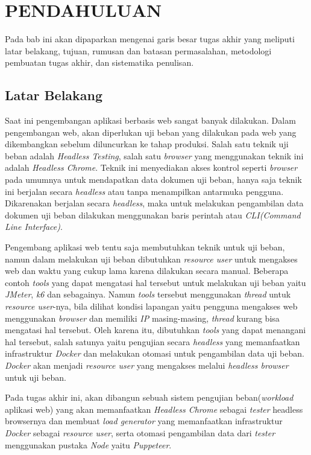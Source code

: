 \chapter{PENDAHULUAN}
	Pada bab ini akan dipaparkan mengenai garis besar tugas akhir yang meliputi latar belakang, tujuan, rumusan dan batasan permasalahan, metodologi pembuatan tugas akhir, dan sistematika penulisan.
        
	\section{Latar Belakang}
		Saat ini pengembangan aplikasi berbasis web sangat banyak dilakukan. Dalam pengembangan web, akan diperlukan uji beban yang dilakukan pada web yang dikembangkan sebelum diluncurkan ke tahap produksi. Salah satu teknik uji beban adalah \textit{Headless Testing}, salah satu \textit{browser} yang menggunakan teknik ini adalah \textit{Headless Chrome}. Teknik ini menyediakan akses kontrol seperti \textit{browser} pada umumnya untuk mendapatkan data dokumen uji beban, hanya saja teknik ini berjalan secara \textit{headless} atau tanpa menampilkan antarmuka pengguna. Dikarenakan berjalan secara \textit{headless}, maka untuk melakukan pengambilan data dokumen uji beban dilakukan menggunakan baris perintah atau \textit{CLI(Command Line Interface)}.
		
		\indent Pengembang aplikasi web tentu saja membutuhkan teknik untuk uji beban, namun dalam melakukan uji beban dibutuhkan \textit{resource user} untuk mengakses web dan waktu yang cukup lama karena dilakukan secara manual. Beberapa contoh \textit{tools} yang dapat mengatasi hal tersebut untuk melakukan uji beban yaitu \textit{JMeter}, \textit{k6} dan sebagainya. Namun \textit{tools} tersebut menggunakan \textit{thread} untuk \textit{resource user}-nya, bila dilihat kondisi lapangan yaitu pengguna mengakses web menggunakan \textit{browser} dan memiliki \textit{IP} masing-masing, \textit{thread} kurang bisa mengatasi hal tersebut. Oleh karena itu, dibutuhkan \textit{tools} yang dapat menangani hal tersebut, salah satunya yaitu pengujian secara \textit{headless} yang memanfaatkan infrastruktur \textit{Docker} dan melakukan otomasi untuk pengambilan data uji beban. \textit{Docker} akan menjadi \textit{resource user} yang mengakses melalui \textit{headless browser} untuk uji beban.
		
		\indent Pada tugas akhir ini, akan dibangun sebuah sistem pengujian beban(\textit{workload} aplikasi web) yang akan memanfaatkan \textit{Headless Chrome} sebagai \textit{tester} headless browsernya dan membuat \textit{load generator} yang memanfaatkan infrastruktur \textit{Docker} sebagai \textit{resource user}, serta otomasi pengambilan data dari \textit{tester} menggunakan pustaka \textit{Node} yaitu \textit{Puppeteer}\cite{puppeteer}.

